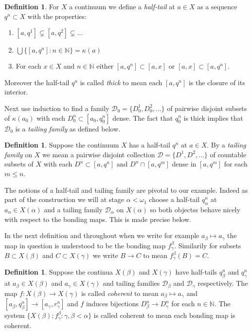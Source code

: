 \documentclass[12pt]{article}
\theoremstyle{plain}
\theoremstyle{definition}
\newtheorem{definition}[theorem]{Definition}
\newcommand{\A}{\ensuremath{\alpha}}
\newcommand{\K}{\ensuremath{\kappa}}
\newcommand{\B}{\ensuremath{\beta}}
\newcommand{\W}{\ensuremath{\omega}}
\newcommand{\G}{\ensuremath{\gamma}}
\newcommand{\NN}{\ensuremath{\mathbb N}}
\newcommand{\0}{\ensuremath{\varnothing}}
\newcommand{\cD}{\ensuremath{\mathcal D}}
\begin{document}
	\begin{definition}\label{halftail}
		For $X$ a continuum we define a \textit{half-tail} at $a \in X$ as a sequence $q^n \subset X$ with the properties:
		
		\begin{enumerate}
			\item $[a,q^1] \varsubsetneq [a,q^2] \varsubsetneq \ldots $
			\item $\bigcup \big \{[a,q^n]:n \in \NN \big \} = \K(a)$
			\item For each $x \in X$ and $n \in \NN$ either $[a,q^n] \subset [a,x]$ or $[a,x] \subset [a,q^n]$.
		\end{enumerate}
		
		Moreover the half-tail $q^n$ is called \textit{thick} to mean each $[a,q^n]$ is the closure of its interior.
	\end{definition}
	
	Next use induction to find a family $\cD_0 = \{D_0^1,D_0^2, \ldots \}$
	of pairwise disjoint subsets of $\K(a_0)$ with each $D^n_0 \subset [a_0,q^n_0]$ dense.
	The fact that $q^n_0$ is thick implies that $\cD_0$ is a \textit{tailing family} as defined below.
	
	
	\begin{definition}\label{tailingfamily}
		Suppose the continuum $X$ has a half-tail $q^n$ at $a \in X$. By a \textit{tailing family} on $X$
		we mean a pairwise disjoint collection $\cD = \{D^1,D^2, \ldots\}$ of countable subsets of $X$
		with each $D^n \subset [a,q^n]$ and $D^n \cap [a,q^m]$ dense in $[a,q^m]$ for each $m \le n$.
	\end{definition} 
	
	
	The notions of a half-tail and tailing family are pivotal to our example. Indeed as part of the construction we will at stage $\A<\W_1$ choose a half-tail $q^n_\A$ at $a_\A \in X(\A)$ and a tailing family $\cD_\A$ on $X(\A)$ so both objectss behave nicely with respect to the bonding maps. This is made precise below.
	
	In the next definition and throughout when we write for example \mbox{$a_\B \mapsto a_\G$} the map in question is understood to be the bonding map $f^\B_\G$.
	Similarily for subsets $B \subset X(\B)$ and $C \subset X(\G)$ we write $B \to C$ to mean $f^\B_\G(B) = C$.
	
	
	\begin{definition}\label{deftailmap}
		Suppose the continua $X(\B)$ and $X(\G)$ have  half-tails $q^n_\B$ and $q^n_\G$ at $a_\B \in X(\B)$ and $a_\G \in X(\G)$ and tailing families $\cD_\B$ and $\cD_\G$ respectively. The map \mbox{$f:X(\B) \to X(\G)$} is called \textit{coherent} to mean $a_\B \mapsto a_\G$ and $[a_\B,q^n_\B ] \to [a_\G,r^n_\G]$ and $f$ induces bijections $D^n_\B \to D^n_\G$ for each $n \in \NN$. The system $\{X(\B); f^\B_\G: \G,\B < \A\}$ is called coherent to mean each bonding map is coherent.
	\end{definition}
	
\end{document}
